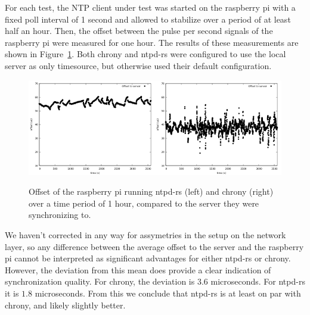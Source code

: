 \documentclass{article}
\begin{document}
For each test, the NTP client under test was started on the raspberry pi with a fixed poll interval of 1 second and allowed to stabilize over a period of at least half an hour. Then, the offset between the pulse per second signals of the raspberry pi were measured for one hour. The results of these measurements are shown in Figure~\ref{fig:offset-time}. Both chrony and ntpd-rs were configured to use the local server as only timesource, but otherwise used their default configuration.

\begin{figure}
\includegraphics[width=0.5\textwidth]{offset-ntpd-rs.png}\includegraphics[width=0.5\textwidth]{offset-chrony.png}
\caption{Offset of the raspberry pi running ntpd-rs (left) and chrony (right) over a time period of 1 hour, compared to the server they were synchronizing to.}\label{fig:offset-time}
\end{figure}

We haven't corrected in any way for assymetries in the setup on the network layer, so any difference between the average offset to the server and the raspberry pi cannot be interpreted as significant advantages for either ntpd-rs or chrony. However, the deviation from this mean does provide a clear indication of synchronization quality. For chrony, the deviation is $3.6$ microseconds. For ntpd-rs it is $1.8$ microseconds. From this we conclude that ntpd-rs is at least on par with chrony, and likely slightly better.



\end{document}
